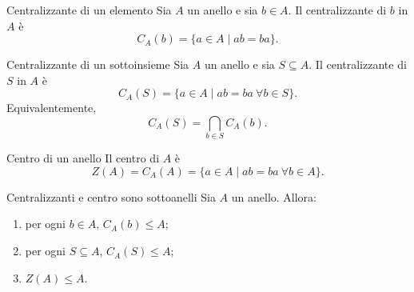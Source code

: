 \documentclass[a4paper]{article}
\begin{document}
\begin{radioactive}
\begin{snippetdefinition}{Centralizzante di un elemento}
    Sia \(A\) un anello e sia \(b \in A\).
    Il centralizzante di \(b\) in \(A\) è
    \[
        C_A(b)
        =
        \{a \in A \mid ab=ba\}.
    \]
\end{snippetdefinition}
\end{radioactive}

\begin{radioactive}
\begin{snippetdefinition}{Centralizzante di un sottoinsieme}
    Sia \(A\) un anello e sia \(S\subseteq A\).
    Il centralizzante di \(S\) in \(A\) è
    \[
        C_A(S)
        =
        \{a \in A \mid ab=ba \ \forall b \in S\}.
    \]
    Equivalentemente,
    \[
        C_A(S)
        =
        \bigcap_{b\in S} C_A(b).
    \]
\end{snippetdefinition}
\end{radioactive}

\begin{radioactive}
\begin{snippetdefinition}{Centro di un anello}
    Il centro di \(A\) è
    \[
        Z(A)
        =
        C_A(A)
        =
        \{a \in A \mid ab=ba \ \forall b \in A\}.
    \]
\end{snippetdefinition}
\end{radioactive}

\begin{radioactive}
\begin{snippetproposition}{Centralizzanti e centro sono sottoanelli}
    Sia \(A\) un anello.
    Allora:
    \begin{enumerate}
        \item per ogni \(b \in A\), \(C_A(b)\leq A\);
        \item per ogni \(S\subseteq A\), \(C_A(S)\leq A\);
        \item \(Z(A)\leq A\).
    \end{enumerate}
\end{snippetproposition}
\end{radioactive}
\end{document}
